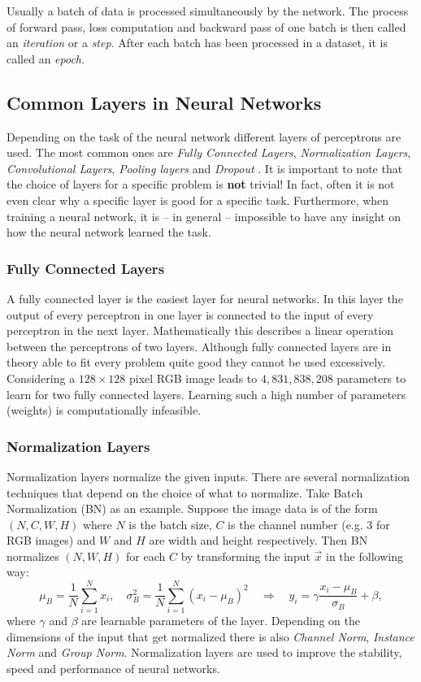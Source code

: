 Usually a batch of data is processed simultaneously by the network. The process of forward pass, loss computation and backward pass of one batch is then called an \textit{iteration} or a \textit{step}. After each batch has been processed in a dataset, it is called an \textit{epoch}.
%
\subsection{Common Layers in Neural Networks} \label{sec:2.1.3}
Depending on the task of the neural network different layers of perceptrons are used. The most common ones are \textit{Fully Connected Layers}, \textit{Normalization Layers}, \textit{Convolutional Layers}, \textit{Pooling layers} and \textit{Dropout }. It is important to note that the choice of layers for a specific problem is \textbf{not} trivial! In fact, often it is not even clear why a specific layer is good for a specific task. Furthermore, when training a neural network, it is – in general – impossible to have any insight on how the neural network learned the task.
%
\subsubsection{Fully Connected Layers}
A fully connected layer is the easiest layer for neural networks. In this layer the output of every perceptron in one layer is connected to the input of every perceptron in the next layer. Mathematically this describes a linear operation between the perceptrons of two layers. Although fully connected layers are in theory able to fit every problem quite good they cannot be used excessively. Considering a $128\times128$ pixel RGB image leads to $4,831,838,208$ parameters to learn for two fully connected layers. Learning such a high number of parameters (weights) is computationally infeasible.
%
\subsubsection{Normalization Layers}
Normalization layers normalize the given inputs. There are several normalization techniques that depend on the choice of what to normalize. Take Batch Normalization (BN) as an example. Suppose the image data is of the form $(N, C, W, H)$ where $N$ is the batch size, $C$ is the channel number (e.g. $3$ for RGB images) and $W$ and $H$ are width and height respectively. Then BN normalizes $(N, W, H)$ for each $C$ by transforming the input $\vec{x}$ in the following way:
%
\begin{equation} \label{equ:2.3}
    \mu_B=\frac{1}{N}\sum_{i=1}^Nx_i, \quad\sigma_B^2=\frac{1}{N}\sum_{i=1}^N(x_i-\mu_B)^2\quad \Longrightarrow\quad y_i=\gamma\frac{x_i-\mu_B}{\sigma_B}+\beta,
\end{equation}
%
where $\gamma$ and $\beta$ are learnable parameters of the layer. Depending on the dimensions of the input that get normalized there is also \textit{Channel Norm}, \textit{Instance Norm} and \textit{Group Norm}. Normalization layers are used to improve the stability, speed and performance of neural networks.
%
